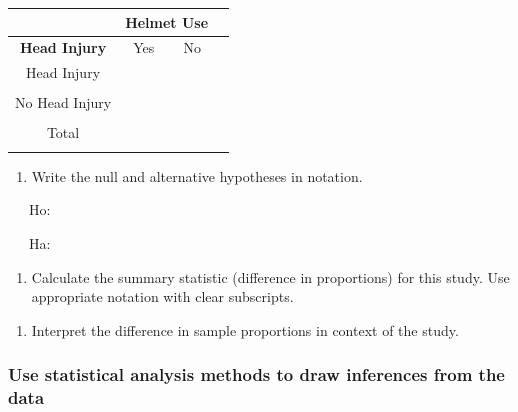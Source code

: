 \documentclass[
]{report}
\providecommand{\tightlist}{%
  \setlength{\itemsep}{0pt}\setlength{\parskip}{0pt}}
\begin{document}
\begin{center}
\begin{tabular}{|c|c|c|c|}\hline
& \multicolumn{2}{|c|}{\textbf{Helmet Use}} & \\ \hline
\textbf{Head Injury} & Yes & No \\ \hline
Head Injury & & & \\ 
 & & & \\ \hline
No Head Injury & & & \\ 
 & & & \\ \hline
 Total & & & \\ 
 & & & \\ \hline
\end{tabular}
\end{center}

\begin{enumerate}
\def\labelenumi{\arabic{enumi}.}
\setcounter{enumi}{1}
\tightlist
\item
  Write the null and alternative hypotheses in notation.
\end{enumerate}

~~~Ho:

\vspace{0.2in}

~~~Ha:

\vspace{0.2in}

\begin{enumerate}
\def\labelenumi{\arabic{enumi}.}
\setcounter{enumi}{2}
\tightlist
\item
  Calculate the summary statistic (difference in proportions) for this study. Use appropriate notation with clear subscripts.
\end{enumerate}

\vspace{0.5in}

\begin{enumerate}
\def\labelenumi{\arabic{enumi}.}
\setcounter{enumi}{3}
\tightlist
\item
  Interpret the difference in sample proportions in context of the study.
  \vspace{0.8in}
\end{enumerate}

\hypertarget{use-statistical-analysis-methods-to-draw-inferences-from-the-data-3}{%
\subsubsection*{Use statistical analysis methods to draw inferences from the data}\label{use-statistical-analysis-methods-to-draw-inferences-from-the-data-3}}
\end{document}
